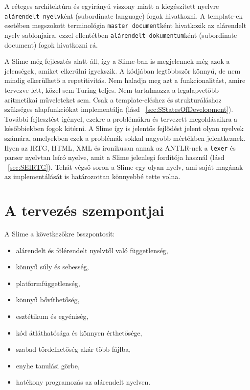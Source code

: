 A réteges architektúra és egyirányú viszony miatt a kiegészített nyelvre \texttt{alárendelt nyelv}ként (subordinate language) fogok hivatkozni.
A template-ek esetében megszokott terminológia \texttt{master document}ként hivatkozik az alárendelt nyelv sablonjaira, ezzel ellentétben \texttt{alárendelt dokumentum}ként (subordinate document) fogok hivatkozni rá. 

A Slime még fejlesztés alatt áll, így a Slime-ban is megjelennek még azok a jelenségek, amiket elkerülni igyekszik. 
A kódjában legtöbbször könnyű, de nem mindig elkerülhető a repetitivitás. 
Nem haladja meg azt a funkcionalitást, amire tervezve lett, közel sem Turing-teljes. 
Nem tartalmazza a legalapvetőbb aritmetikai műveleteket sem. 
Csak a template-eléshez és strukturáláshoz szükséges alapfunkciókat implementálja (lásd ~\ref{sec:SStatesOfDevelopment}). 
További fejlesztést igényel, ezekre a problémákra és tervezett megoldásaikra a későbbiekben fogok kitérni. 
A Slime így is jelentős fejlődést jelent olyan nyelvek számára, amelyekben ezek a problémák sokkal nagyobb mértékben jelentkeznek. 
Ilyen az IRTG, HTML, XML és ironikusan annak az ANTLR-nek a \texttt{lexer} és parser nyelvtan leíró nyelve, amit a Slime jelenlegi fordítója használ (lásd ~\ref{sec:SEIRTG}). 
Tehát végső soron a Slime egy olyan nyelv, ami saját magának az implementálását is határozottan könnyebbé tette volna.


\section{A tervezés szempontjai}
\label{sec:SDesign}
A Slime a következőkre összpontosít:
\begin{itemize}
\item alárendelt és fölérendelt nyelvtől való függetlenség,
\item könnyű súly és sebesség,
\item platformfüggetlenség,
\item könnyű bővíthetőség,
\item esztétikum és egyéniség,
\item kód átláthatósága és könnyen érthetősége,
\item szabad tördelhetőség akár több fájlba,
\item enyhe tanulási görbe,
\item hatékony programozás az alárendelt nyelven.
\end{itemize}

